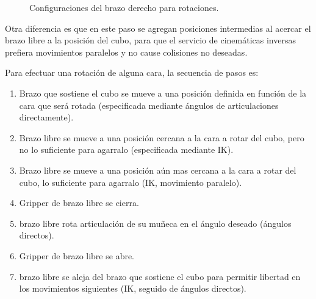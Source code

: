 \begin{figure}[h!]
	\centering
	\hfill
	\hfill
	\caption{Configuraciones del brazo derecho para rotaciones.}
	\label{mover}
\end{figure}
Otra diferencia es que en este paso se agregan posiciones intermedias al acercar el brazo libre a la posición del cubo, para que el servicio de cinemáticas inversas prefiera movimientos paralelos y no cause colisiones no deseadas.

Para efectuar una rotación de alguna cara, la secuencia de pasos es:
\begin{enumerate}
	\item Brazo que sostiene el cubo se mueve a una posición definida en función de la cara que será rotada (especificada mediante ángulos de articulaciones directamente).
	\item Brazo libre se mueve a una posición cercana a la cara a rotar del cubo, pero no lo suficiente para agarralo (especificada mediante IK).
	\item Brazo libre se mueve a una posición aún mas cercana a la cara a rotar del cubo, lo suficiente para agarralo (IK, movimiento paralelo).
	\item Gripper de brazo libre se cierra.
	\item brazo libre rota articulación de su muñeca en el ángulo deseado (ángulos directos).
	\item Gripper de brazo libre se abre.
	\item brazo libre se aleja del brazo que sostiene el cubo para permitir libertad en los movimientos siguientes (IK, seguido de ángulos directos).
\end{enumerate}

